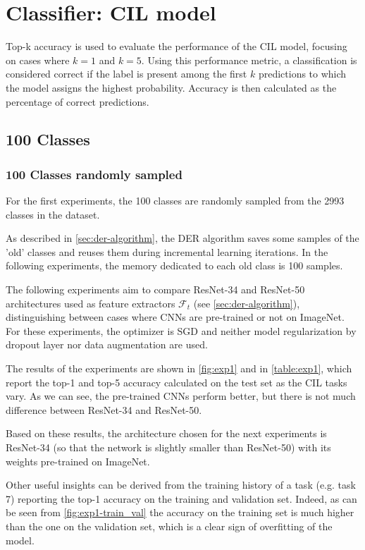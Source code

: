 \section{Classifier: CIL model}
\label{sec:exp-cil}
Top-k accuracy is used to evaluate the performance of the CIL model, focusing on cases where $k=1$ and $k=5$.
Using this performance metric, a classification is considered correct if the label is present among the first $k$ predictions to which the model assigns the highest probability.
Accuracy is then calculated as the percentage of correct predictions.

\subsection{100 Classes}
\subsubsection{100 Classes randomly sampled}
For the first experiments, the 100 classes are randomly sampled from the 2993 classes in the dataset.



As described in \autoref{sec:der-algorithm}, the DER algorithm saves some samples of the 'old' classes and reuses them during incremental learning iterations.
In the following experiments, the memory dedicated to each old class is 100 samples.

The following experiments aim to compare ResNet-34 and ResNet-50 architectures used as feature extractors $\mathcal{F}_t$ (see \autoref{sec:der-algorithm}), distinguishing between cases where CNNs are pre-trained or not on ImageNet.
For these experiments, the optimizer is SGD and neither model regularization by dropout layer nor data augmentation are used.

The results of the experiments are shown in \autoref{fig:exp1} and in \autoref{table:exp1}, which report the top-1 and top-5 accuracy calculated on the test set as the CIL tasks vary. As we can see, the pre-trained CNNs perform better, but there is not much difference between ResNet-34 and ResNet-50.

Based on these results, the architecture chosen for the next experiments is ResNet-34 (so that the network is slightly smaller than ResNet-50) with its weights pre-trained on ImageNet.

Other useful insights can be derived from the training history of a task (e.g. task 7) reporting the top-1 accuracy on the training and validation set.
Indeed, as can be seen from \autoref{fig:exp1-train_val} the accuracy on the training set is much higher than the one on the validation set, which is a clear sign of overfitting of the model.

